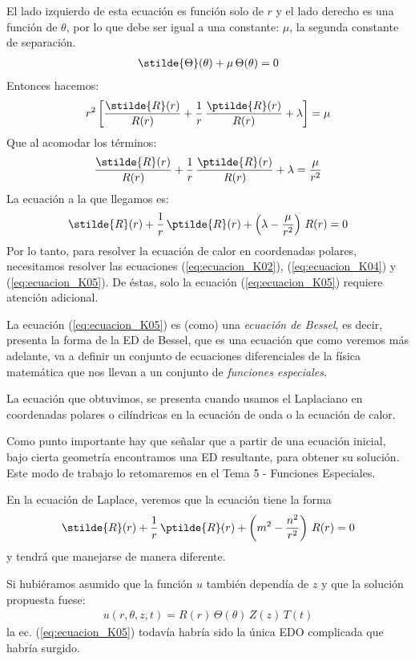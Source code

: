 El lado izquierdo de esta ecuación es función solo de $r$ y el lado derecho es una función de $\theta$, por lo que debe ser igual a una constante: $\mu$, la segunda constante de separación.
\begin{align}
\stilde{\Theta} (\theta) + \mu \, \Theta (\theta) = 0
\label{eq:ecuacion_K04}    
\end{align}
Entonces hacemos:
\begin{align*}
r^{2} \left[ \dfrac{\stilde{R} (r)}{R (r)} + \dfrac{1}{r} \, \dfrac{\ptilde{R} (r)}{R (r)} + \lambda \right] = \mu
\end{align*}
Que al acomodar los términos:
\begin{align*}
\dfrac{\stilde{R} (r)}{R (r)} + \dfrac{1}{r} \, \dfrac{\ptilde{R} (r)}{R (r)} + \lambda = \dfrac{\mu}{r^{2}}
\end{align*}
La ecuación a la que llegamos es:
\begin{align}
\stilde{R} (r) + \dfrac{1}{r} \, \ptilde{R} (r) + \left( \lambda - \dfrac{\mu}{r^{2}} \right) \, R(r) = 0
\label{eq:ecuacion_K05}    
\end{align}
Por lo tanto, para resolver la ecuación de calor en coordenadas polares, necesitamos resolver las ecuaciones (\ref{eq:ecuacion_K02}), (\ref{eq:ecuacion_K04}) y (\ref{eq:ecuacion_K05}). De éstas, solo la ecuación (\ref{eq:ecuacion_K05}) requiere atención adicional.
\par
La ecuación (\ref{eq:ecuacion_K05}) es (como) una \emph{ecuación de Bessel}, es decir, presenta la forma de la ED de Bessel, que es una ecuación que como veremos más adelante, va a definir un conjunto de ecuaciones diferenciales de la física matemática que nos llevan a un conjunto de \emph{funciones especiales}.
\par
La ecuación que obtuvimos, se presenta cuando usamos el Laplaciano en coordenadas polares o cilíndricas en la ecuación de onda o la ecuación de calor.
\par
Como punto importante hay que señalar que a partir de una ecuación inicial, bajo cierta geometría encontramos una ED resultante, para obtener su solución. Este modo de trabajo lo retomaremos en el Tema 5 - Funciones Especiales.
\par
En la ecuación de Laplace, veremos que la ecuación tiene la forma
\begin{align*}
\stilde{R} (r) + \dfrac{1}{r} \, \ptilde{R} (r) + \left( m^{2} - \dfrac{n^{2}}{r^{2}} \right) \, R(r) = 0
\end{align*}
y tendrá que manejarse de manera diferente.
\par
Si hubiéramos asumido que la función $u$ también dependía de $z$ y que la solución propuesta fuese:
\begin{align*}
u(r, \theta, z, t) =  R(r) \, \Theta (\theta) \, Z(z) \, T(t) 
\end{align*}
la ec. (\ref{eq:ecuacion_K05}) todavía habría sido la única EDO complicada que habría surgido.

